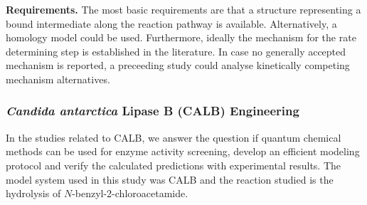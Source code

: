 \textbf{Requirements.}
The most basic requirements are that a structure representing a bound intermediate along the reaction pathway is available.
Alternatively, a homology model could be used.
Furthermore, ideally the mechanism for the rate determining step is established in the literature.
In case no generally accepted mechanism is reported, a preceeding study could analyse kinetically competing mechanism alternatives.

\subsubsection{{\textit{Candida antarctica} Lipase B (CALB) Engineering}}
In the studies related to CALB\cite{10.1371/journal.pone.0049849, hediger2013silico}, we answer the question if quantum chemical methods can be used for enzyme activity screening, develop an efficient modeling protocol and verify the calculated predictions with experimental results.
The model system used in this study was CALB and the reaction studied is the hydrolysis of $N$-benzyl-2-chloroacetamide.


